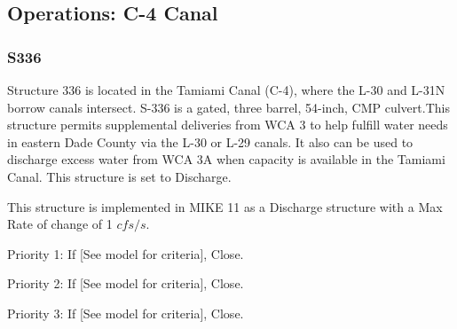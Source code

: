 \clearpage
\subsection{Operations: C-4 Canal}

\subsubsection{S336}
Structure 336 is located in the Tamiami Canal (C-4), where the L-30 and L-31N borrow
canals intersect. S-336 is a gated, three barrel, 54-inch, CMP culvert.This structure permits supplemental deliveries from WCA 3 to help fulfill water needs in eastern Dade County via the L-30 or L-29 canals. It also can be used to discharge excess water from WCA 3A when capacity is available in the Tamiami Canal. This structure is set to Discharge.

This structure is implemented in MIKE 11 as a Discharge structure with a Max Rate of change of 1 $cfs/s$.

\begin{packed_items}
\item Priority 1: If \textcolor[rgb]{1.00,0.00,0.00}{[See model for criteria]}, Close.
\item Priority 2: If \textcolor[rgb]{1.00,0.00,0.00}{[See model for criteria]}, Close.
\item Priority 3: If \textcolor[rgb]{1.00,0.00,0.00}{[See model for criteria]}, Close.
\end{packed_items}


